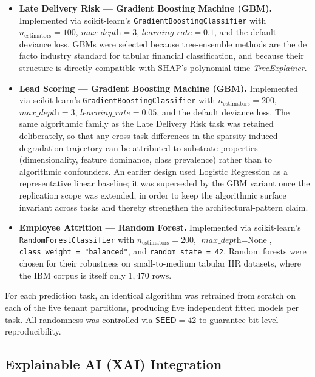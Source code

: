 \begin{itemize}
    \item \textbf{Late Delivery Risk --- Gradient Boosting Machine (GBM).}
    Implemented via scikit-learn's \texttt{GradientBoostingClassifier} with
    $n_{\text{estimators}} = 100$, $\textit{max\_depth} = 3$,
    $\textit{learning\_rate} = 0.1$, and the default deviance loss. GBMs were
    selected because tree-ensemble methods are the de facto industry
    standard for tabular financial classification, and because their
    structure is directly compatible with SHAP's polynomial-time
    \emph{TreeExplainer}.
    \item \textbf{Lead Scoring --- Gradient Boosting Machine (GBM).}
    Implemented via scikit-learn's \texttt{GradientBoostingClassifier} with
    $n_{\text{estimators}} = 200$, $\textit{max\_depth} = 3$,
    $\textit{learning\_rate} = 0.05$, and the default deviance loss. The
    same algorithmic family as the Late Delivery Risk task was retained
    deliberately, so that any cross-task differences in the sparsity-induced
    degradation trajectory can be attributed to substrate properties
    (dimensionality, feature dominance, class prevalence) rather than to
    algorithmic confounders. An earlier design used Logistic Regression as a
    representative linear baseline; it was superseded by the GBM variant
    once the replication scope was extended, in order to keep the algorithmic
    surface invariant across tasks and thereby strengthen the
    architectural-pattern claim.
    \item \textbf{Employee Attrition --- Random Forest.} Implemented via
    scikit-learn's \texttt{RandomForestClassifier} with $n_{\text{estimators}}
    = 200$, $\textit{max\_depth} = \text{None}$,
    \texttt{class\_weight = "balanced"}, and \texttt{random\_state = 42}.
    Random forests were chosen for their robustness on small-to-medium
    tabular HR datasets, where the IBM corpus is itself only $1{,}470$ rows.
\end{itemize}

For each prediction task, an identical algorithm was retrained from scratch
on each of the five tenant partitions, producing five independent fitted
models per task. All randomness was controlled via $\textsf{SEED} = 42$ to
guarantee bit-level reproducibility.

\subsection{Explainable AI (XAI) Integration}
\label{subsec:xai-integration}

